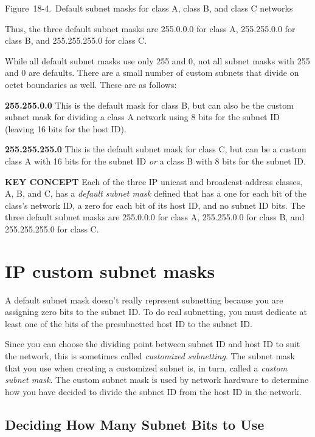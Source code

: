 \documentclass[b5paper,11pt]{memoir}
\begin{document}
Figure~18-4.~Default subnet masks for class A, class B, and class C
networks

\protect\hypertarget{ch18s04.htmlux5cux23idx-CHP-18-0735}{}{}Thus, the
three default subnet masks are 255.0.0.0 for class A, 255.255.0.0 for
class B, and 255.255.255.0 for class C.

While all default subnet masks use only 255 and 0, not all subnet masks
with 255 and 0 are defaults. There are a small number of custom subnets
that divide on octet boundaries as well. These are as follows:

{\textbf{255.255.0.0}} This is the default mask for class B, but can
also be the custom subnet mask for dividing a class A network using 8
bits for the subnet ID (leaving 16 bits for the host ID).

{\textbf{255.255.255.0}} This is the default subnet mask for class C,
but can be a custom class A with 16 bits for the subnet ID {\emph{or}} a
class B with 8 bits for the subnet ID.


{\textbf{KEY CONCEPT}} Each of the three IP unicast and broadcast
address classes, A, B, and C, has a {\emph{default subnet mask}} defined
that has a one for each bit of the class's network ID, a zero for each
bit of its host ID, and no subnet ID bits. The three default subnet
masks are 255.0.0.0 for class A, 255.255.0.0 for class B, and
255.255.255.0 for class C.



\section{IP custom subnet masks}

A default subnet mask doesn't really represent subnetting because you
are assigning zero bits to the subnet ID. To do real subnetting, you
must dedicate at least one of the bits of the presubnetted host ID to
the subnet ID.

Since you can choose the dividing point between subnet ID and host ID to
suit the network, this is sometimes called
\protect\hypertarget{ch18s05.htmlux5cux23idx-CHP-18-0736}{}{}{\emph{customized
subnetting}}. The subnet mask that you use when creating a customized
subnet is, in turn, called a {\emph{custom subnet mask}}. The custom
subnet mask is used by network hardware to determine how you have
decided to divide the subnet ID from the host ID in the network.



\subsection{Deciding How Many Subnet Bits to Use}
\end{document}
